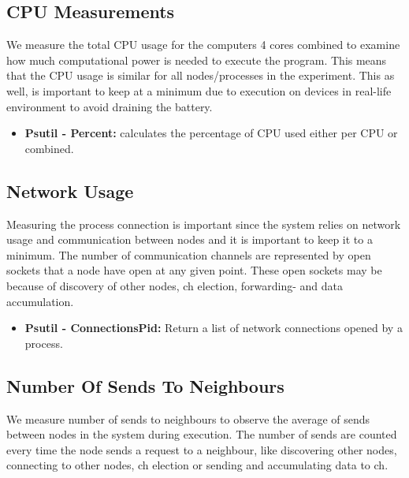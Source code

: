\documentclass[USenglish]{uit-thesis}
\begin{document}
\subsection{CPU Measurements} \label{eva:cpu_measure}
We measure the total CPU usage for the computers 4 cores combined to examine how much computational power is needed to execute the program. This means that the CPU usage is similar for all nodes/processes in the experiment.
This as well, is important to keep at a minimum due to execution on devices in real-life environment to avoid draining the battery.


\begin{itemize}
\item \textbf{Psutil - Percent:} calculates the percentage of CPU used either per CPU or combined.
\end{itemize}


\subsection{Network Usage} \label{eva:net_measure}

Measuring the process connection is important since the system relies on network usage and communication between nodes and it is important to keep it to a minimum. The number of communication channels are represented by open sockets that a node have open at any given point. These open sockets may be because of discovery of other nodes, \gls{ch} election, forwarding- and data accumulation.

\begin{itemize}
\item \textbf{Psutil - ConnectionsPid:} Return a list of network connections opened by a process.
\end{itemize}



\subsection{Number Of Sends To Neighbours}
We measure number of sends to neighbours to observe the average of sends between nodes in the system during execution. The number of sends are counted every time the node sends a request to a neighbour, like discovering other nodes, connecting to other nodes, \gls{ch} election or sending and accumulating data to \gls{ch}.
\end{document}
